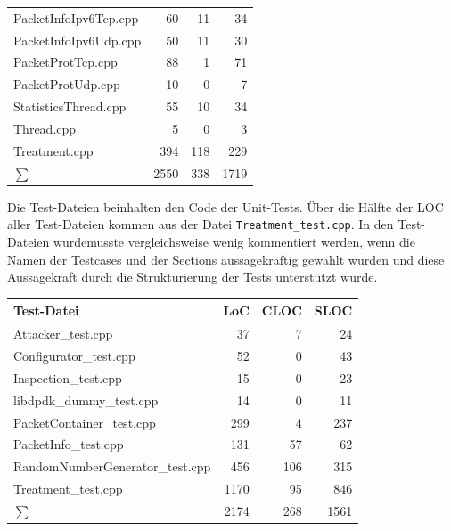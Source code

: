 \documentclass[../review_3.tex]{subfiles}
\begin{document}
\begin{longtable}[H]{p{10cm}rrr}
    PacketInfoIpv6Tcp.cpp    & 60           & 11            & 34            \\
    PacketInfoIpv6Udp.cpp    & 50           & 11            & 30            \\
    PacketProtTcp.cpp        & 88           & 1             & 71            \\
    PacketProtUdp.cpp        & 10           & 0             & 7             \\
    StatisticsThread.cpp     & 55           & 10            & 34            \\ %
    Thread.cpp               & 5            & 0             & 3             \\
    Treatment.cpp            & 394          & 118           & 229           \\ \midrule
    $\sum$                   & 2550         & 338           & 1719          \\ \bottomrule
\end{longtable}

Die Test-Dateien beinhalten den Code der Unit-Tests. Über die Hälfte der LOC aller Test-Dateien kommen aus der Datei \texttt{Treatment\_test.cpp}.
In den Test-Dateien wurdemusste vergleichsweise wenig kommentiert werden, wenn die Namen der Testcases und der Sections aussagekräftig gewählt wurden und diese Aussagekraft durch die Strukturierung der Tests unterstützt wurde.
\begin{longtable}[H]{p{10cm}rrr} \toprule
    \textbf{Test-Datei}             & \textbf{LoC} & \textbf{CLOC} & \textbf{SLOC} \\ \midrule \endhead
    Attacker\_test.cpp              & 37           & 7             & 24            \\
    Configurator\_test.cpp          & 52           & 0             & 43            \\
    Inspection\_test.cpp            & 15           & 0             & 23            \\
    libdpdk\_dummy\_test.cpp        & 14           & 0             & 11            \\
    PacketContainer\_test.cpp       & 299          & 4             & 237           \\
    PacketInfo\_test.cpp            & 131          & 57            & 62            \\ %
    RandomNumberGenerator\_test.cpp & 456          & 106           & 315           \\
    Treatment\_test.cpp             & 1170         & 95            & 846           \\  \midrule
    $\sum$                          & 2174         & 268           & 1561          \\ \bottomrule
\end{longtable}
\end{document}
